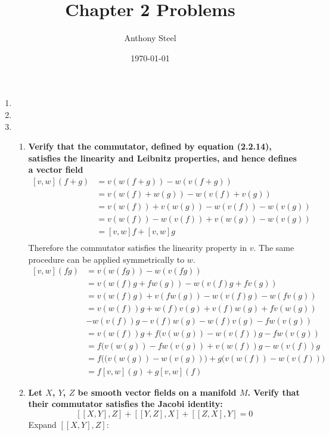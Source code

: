 \documentclass[a4paper]{article}
\begin{document}
\title{Chapter 2 Problems}
\author{Anthony Steel}
\date{\today}
\maketitle
\begin{enumerate}
  \item
  \item
  \item
    \begin{enumerate}
    \item
    \textbf{Verify that the commutator, defined by equation (2.2.14),
    satisfies the linearity and Leibnitz properties, and hence defines a
    vector field}
  \[
    \begin{align}
    [v,w](f+g) &= v(w(f+g)) - w(v(f+g))\\
               &= v(w(f)+w(g))-w(v(f)+v(g))\\
               &= v(w(f))+v(w(g))-w(v(f))-w(v(g))\\
               &= v(w(f))-w(v(f))+v(w(g))-w(v(g))\\
               &= [v,w]f+[v,w]g\\
    \end{align}
  \]
  Therefore the commutator satisfies the linearity property in $v$. The same
  procedure can be applied symmetrically to $w$.
  \[
    \begin{align}
      [v,w](fg) &= v(w(fg)) - w(v(fg))\\
                &= v(w(f)g+fw(g)) - w(v(f)g+fv(g))\\
                &= v(w(f)g)+v(fw(g)) - w(v(f)g)-w(fv(g))\\
                &= v(w(f))g+w(f)v(g)+v(f)w(g)+fv(w(g))\\
                &-w(v(f))g-v(f)w(g)-w(f)v(g)-fw(v(g))\\
                &= v(w(f))g+f(v(w(g))-w(v(f))g-fw(v(g))\\
                &= f(v(w(g))-fw(v(g))+v(w(f))g-w(v(f))g\\
                &= f\Big((v(w(g))-w(v(g))\Big)+g\Big(v(w(f))-w(v(f))\Big)\\
                &= f[v,w](g)+g[v,w](f)
    \end{align}
  \]
\item \textbf{Let $X$, $Y$, $Z$ be smooth vector fields on a manifold $M$. Verify
  that their commutator satisfies the Jacobi identity:}
  \[
    [[X,Y],Z] + [[Y,Z],X] + [[Z,X],Y] = 0
  \]
  Expand $[[X,Y],Z]$:
  \[
    \begin{align}

\end{align}\]
\end{enumerate}
\end{enumerate}
\end{document}
